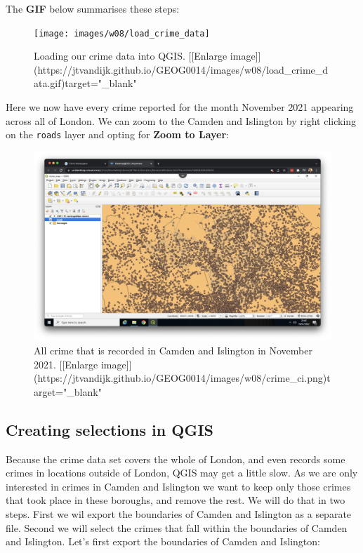 \documentclass[
]{book}
\begin{document}
The \textbf{GIF} below summarises these steps:

\begin{figure}

{\centering \texttt{[image: images/w08/load\_crime\_data]} 

}

\caption{Loading our crime data into QGIS. [[Enlarge image]](https://jtvandijk.github.io/GEOG0014/images/w08/load_crime_data.gif){target="_blank"}}\label{fig:load-crime-data}
\end{figure}

Here we now have every crime reported for the month November 2021 appearing across all of London. We can zoom to the Camden and Islington by right clicking on the \texttt{roads} layer and opting for \textbf{Zoom to Layer}:

\begin{figure}

{\centering \includegraphics[width=850pt]{images/w08/crime_ci} 

}

\caption{All crime that is recorded in Camden and Islington in November 2021. [[Enlarge image]](https://jtvandijk.github.io/GEOG0014/images/w08/crime_ci.png){target="_blank"}}\label{fig:crime-ci}
\end{figure}

\hypertarget{creating-selections-in-qgis}{%
\subsection*{Creating selections in QGIS}\label{creating-selections-in-qgis}}

Because the crime data set covers the whole of London, and even records some crimes in locations outside of London, QGIS may get a little slow. As we are only interested in crimes in Camden and Islington we want to keep only those crimes that took place in these boroughs, and remove the rest. We will do that in two steps. First we wil export the boundaries of Camden and Islington as a separate file. Second we will select the crimes that fall within the boundaries of Camden and Islington. Let's first export the boundaries of Camden and Islington:
\end{document}
